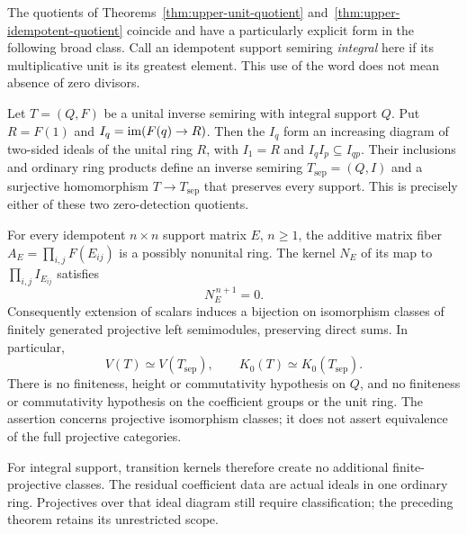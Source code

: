 The quotients of Theorems~\ref{thm:upper-unit-quotient} and~\ref{thm:upper-idempotent-quotient} coincide and have a particularly
explicit form in the following broad class. Call an idempotent support semiring \emph{integral} here if its
multiplicative unit is its greatest element. This use of the word does
not mean absence of zero divisors.

\begin{theorem}
\label{thm:integral-support-reduction}
Let $T=(Q,F)$ be a unital inverse semiring with integral support $Q$.
Put $R=F(1)$ and $I_q=\operatorname{im}(F(q)\to R)$. Then the $I_q$ form an
increasing diagram of two-sided ideals of the unital ring $R$, with
$I_1=R$ and $I_qI_p\subseteq I_{qp}$. Their inclusions and ordinary
ring products define an inverse semiring $T_{\mathrm{sep}}=(Q,I)$ and
a surjective homomorphism $T\to T_{\mathrm{sep}}$ that preserves every
support. This is precisely either of these two zero-detection quotients.

For every idempotent $n\times n$ support matrix $E$, $n\geq1$, the
additive matrix fiber $A_E=\prod_{i,j}F(E_{ij})$ is a possibly
nonunital ring. The kernel $N_E$ of its map to
$\prod_{i,j}I_{E_{ij}}$ satisfies
\[
 N_E^{\,n+1}=0.
\]
Consequently extension of scalars induces a bijection on isomorphism
classes of finitely generated projective left semimodules, preserving
direct sums. In particular,
\[
 V(T)\simeq V(T_{\mathrm{sep}}),\qquad
 K_0(T)\simeq K_0(T_{\mathrm{sep}}).
\]
There is no finiteness, height or commutativity hypothesis on $Q$, and
no finiteness or commutativity hypothesis on the coefficient groups or
the unit ring. The assertion concerns projective isomorphism classes;
it does not assert equivalence of the full projective categories.
\end{theorem}

For integral support, transition kernels therefore create no additional
finite-projective classes. The residual coefficient data are actual
ideals in one ordinary ring. Projectives over that ideal diagram still
require classification; the preceding theorem retains its unrestricted scope.
